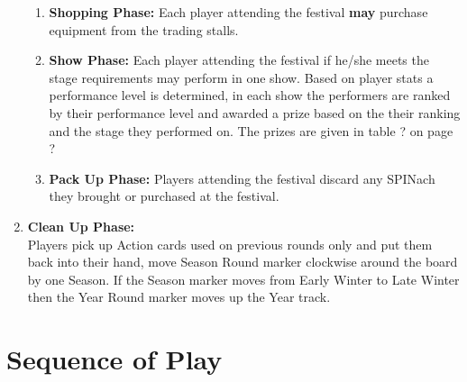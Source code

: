 \begin{enumerate}
\begin{enumerate}[I]
			\item \textbf{Shopping Phase:} Each player attending the festival \textbf{may} purchase equipment from the trading stalls. 
			\item \textbf{Show Phase:} Each player attending the festival if he/she meets the stage requirements may perform in one show. 
				Based on player stats a performance level is determined, in each show the performers are ranked by their performance level and awarded a prize based on the their ranking and the stage they performed on. 
				The prizes are given in table ? on page ?
			\item \textbf{Pack Up Phase:} Players attending the festival discard any SPINach they brought or purchased at the festival.
		\end{enumerate}
		\item \textbf{Clean Up Phase:} \hfill \\
			Players pick up Action cards used on previous rounds only and put them back into their hand, move Season Round marker clockwise around the board by one Season. 
			If the Season marker moves from Early Winter to Late Winter then the Year Round marker moves up the Year track.
	\end{enumerate}
	\section{Sequence of Play}
